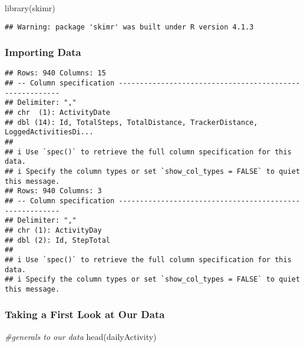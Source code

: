 \documentclass[
]{article}
\newenvironment{Shaded}{\begin{snugshade}}{\end{snugshade}}
\newcommand{\CommentTok}[1]{\textcolor[rgb]{0.56,0.35,0.01}{\textit{#1}}}
\newcommand{\FunctionTok}[1]{\textcolor[rgb]{0.00,0.00,0.00}{#1}}
\newcommand{\NormalTok}[1]{#1}
\begin{document}
\begin{Shaded}
\begin{Highlighting}[]
\FunctionTok{library}\NormalTok{(skimr)}
\end{Highlighting}
\end{Shaded}

\begin{verbatim}
## Warning: package 'skimr' was built under R version 4.1.3
\end{verbatim}

\hypertarget{importing-data}{%
\subsubsection{Importing Data}\label{importing-data}}

\begin{verbatim}
## Rows: 940 Columns: 15
## -- Column specification --------------------------------------------------------
## Delimiter: ","
## chr  (1): ActivityDate
## dbl (14): Id, TotalSteps, TotalDistance, TrackerDistance, LoggedActivitiesDi...
## 
## i Use `spec()` to retrieve the full column specification for this data.
## i Specify the column types or set `show_col_types = FALSE` to quiet this message.
## Rows: 940 Columns: 3
## -- Column specification --------------------------------------------------------
## Delimiter: ","
## chr (1): ActivityDay
## dbl (2): Id, StepTotal
## 
## i Use `spec()` to retrieve the full column specification for this data.
## i Specify the column types or set `show_col_types = FALSE` to quiet this message.
\end{verbatim}

\hypertarget{taking-a-first-look-at-our-data}{%
\subsubsection{Taking a First Look at Our
Data}\label{taking-a-first-look-at-our-data}}

\begin{Shaded}
\begin{Highlighting}[]
\CommentTok{\#generals to our data}
\FunctionTok{head}\NormalTok{(dailyActivity)}
\end{Highlighting}
\end{Shaded}
\end{document}
